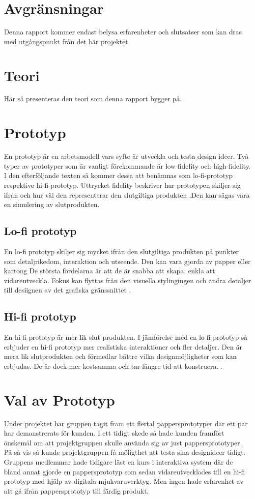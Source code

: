 \section{Avgränsningar}
Denna rapport kommer endast belysa erfarenheter och slutsatser som kan dras med utgångspunkt från det här projektet.

\section{Teori}
Här så presenteras den teori som denna rapport bygger på.

\section{Prototyp}
En prototyp är en arbetsmodell vars syfte är utveckla och testa design ideer. Två typer av prototyper som är vanligt förekommande är low-fidelity och high-fidelity. I den efterföljande texten så  kommer dessa att benämnas som lo-fi-prototyp respektive hi-fi-prototyp. Uttrycket fidelity beskriver hur prototypen skiljer sig ifrån och hur väl den representerar den slutgiltiga produkten \cite{prototypeChoise}.Den kan sägas vara en simulering av slutprodukten.     

\subsection{Lo-fi prototyp}
En lo-fi prototyp skiljer sig mycket ifrån den slutgiltiga produkten på punkter som detaljrikedom, interaktion och utseende. Den kan vara gjorda av papper eller kartong De största fördelarna är att de är snabba att skapa, enkla att vidareutveckla. Fokus kan flyttas från den visuella stylingingen och andra detaljer till desiignen av det grafiska gränssnittet \cite{prototypeChoise}.

\subsection{Hi-fi prototyp}
En hi-fi prototyp är mer lik slut produkten.  I jämförelse med en lo-fi prototyp så erbjuder en hi-fi prototyp mer realistiska interaktioner och fler detaljer. Den är mera lik slutprodukten och förmedlar bättre vilka designmöjligheter som kan erbjudas. De är dock mer kostsamma och tar längre tid att konstruera.  \cite{prototypeChoise}.

\section{Val av Prototyp} 
Under projektet har gruppen tagit fram ett flertal pappersprototyper där ett par har demonstrerats för kunden. I ett tidigt skede så hade kunden framfört önskemål om att projektgruppen skulle använda sig av just pappersprototyper. På så vis så kunde projektgruppen få möligthet att testa sina designideer tidigt. Gruppens medlemmar hade tidigare läst en kurs i interaktiva system där de bland annat gjorde en pappersprototyp som sedan vidareutvecklades till en hi-fi prototyp med hjälp av digitala mjukvaruverktyg. Men ingen hade erfarenhet av att gå ifrån pappersprototyp till färdig produkt. 

